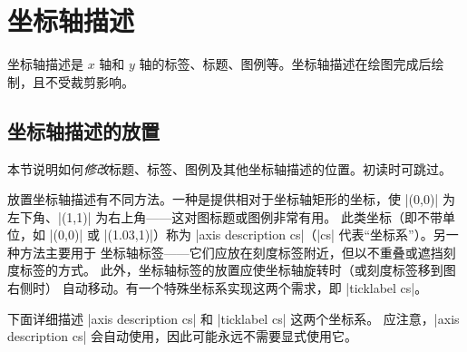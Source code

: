 
\section{坐标轴描述}

坐标轴描述是 $x$ 轴和 $y$ 轴的标签、标题、图例等。坐标轴描述在绘图完成后绘制，且不受裁剪影响。


\subsection{坐标轴描述的放置}

本节说明如何\emph{修改}标题、标签、图例及其他坐标轴描述的位置。初读时可跳过。

放置坐标轴描述有不同方法。一种是提供相对于坐标轴矩形的坐标，使
|(0,0)| 为左下角、|(1,1)| 为右上角——这对图标题或图例非常有用。
此类坐标（即不带单位，如 |(0,0)| 或 |(1.03,1)|）称为
|axis description cs|（|cs| 代表``坐标系''）。另一种方法主要用于
坐标轴标签——它们应放在刻度标签附近，但以不重叠或遮挡刻度标签的方式。
此外，坐标轴标签的放置应使坐标轴旋转时（或刻度标签移到图右侧时）
自动移动。有一个特殊坐标系实现这两个需求，即 |ticklabel cs|。

下面详细描述 |axis description cs| 和 |ticklabel cs| 这两个坐标系。
应注意，|axis description cs| 会自动使用，因此可能永远不需要显式使用它。


